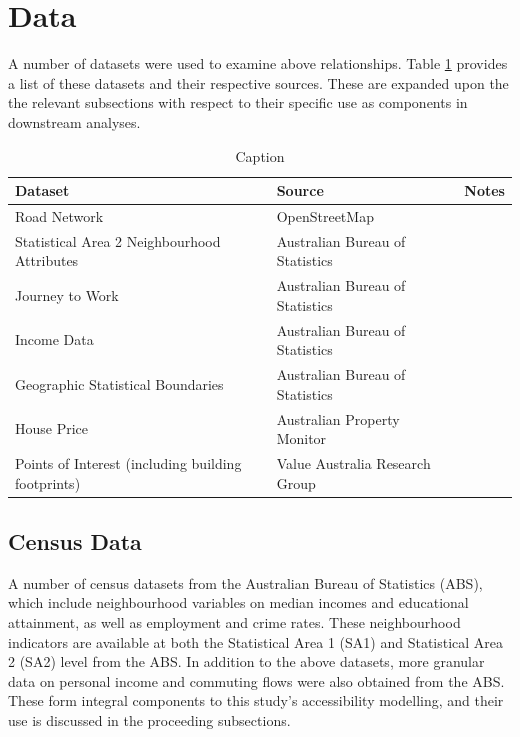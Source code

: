\section{Data}
\label{sec:data}

A number of datasets were used to examine above relationships. Table \ref{tab:data_source} provides a list of these datasets and their respective sources. These are expanded upon the the relevant subsections with respect to their specific use as components in downstream analyses.\\

\renewcommand{\baselinestretch}{0.8}
\begin{table}[!ht]
    \centering \small
    \begin{tabular}{llr}
    \textbf{Dataset} & \textbf{Source} & \multicolumn{1}{l}{\textbf{Notes}} \\
    \midrule
    Road Network & OpenStreetMap &  \\
    Statistical Area 2 Neighbourhood Attributes & Australian Bureau of Statistics & \\
    Journey to Work & Australian Bureau of Statistics &  \\
    Income Data & Australian Bureau of Statistics &  \\
    Geographic Statistical Boundaries & Australian Bureau of Statistics & \\
    House Price & Australian Property Monitor & \\
    Points of Interest (including building footprints) & Value Australia Research Group &  \\
    \midrule
    \end{tabular}
    \caption{Caption}
    \label{tab:data_source}
\end{table}

\subsection{Census Data}

A number of census datasets from the Australian Bureau of Statistics (ABS), which include neighbourhood variables on median incomes and educational attainment, as well as employment and crime rates. These neighbourhood indicators are available at both the Statistical Area 1 (SA1) and Statistical Area 2 (SA2) level from the ABS. In addition to the above datasets, more granular data on personal income and commuting flows were also obtained from the ABS. These form integral components to this study's accessibility modelling, and their use is discussed in the proceeding subsections.\\

